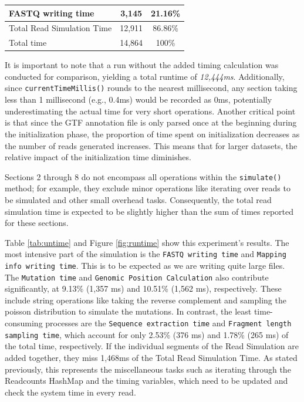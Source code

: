 \documentclass{article}
\begin{document}
\begin{table}[]
{\begin{tabular}{|l|c|c|}
                FASTQ writing time                & 3,145                                                                   & 21.16\%                                                                             \\ \hline
                Total Read Simulation Time        & 12,911                                                                  & 86.86\%                                                                             \\ \hline
                \rowcolor[HTML]{EFEFEF}
                Total time                        & 14,864                                                                  & 100\%                                                                               \\ \hline
            \end{tabular}%
        }
    \end{table}

    It is important to note that a run without the added timing calculation was conducted for comparison, yielding a total runtime of \emph{12,444ms}. Additionally, since \texttt{currentTimeMillis()} rounds to the nearest millisecond, any section taking less than 1 millisecond (e.g., 0.4ms) would be recorded as 0ms, potentially underestimating the actual time for very short operations. Another critical point is that since the GTF annotation file is only parsed once at the beginning during the initialization phase, the proportion of time spent on initialization decreases as the number of reads generated increases. This means that for larger datasets, the relative impact of the initialization time diminishes.


    Sections 2 through 8 do not encompass all operations within the \texttt{simulate()} method; for example, they exclude minor operations like iterating over reads to be simulated and other small overhead tasks. Consequently, the total read simulation time is expected to be slightly higher than the sum of times reported for these sections.

    Table \ref{tab:untime} and Figure \ref{fig:runtime} show this experiment's results. The most intensive part of the simulation is the \texttt{FASTQ writing time} and \texttt{Mapping info writing time}. This is to be expected as we are writing quite large files. The \texttt{Mutation time} and \texttt{Genomic Position Calculation} also contribute significantly, at 9.13\% (1,357 ms) and 10.51\% (1,562 ms), respectively. These include string operations like taking the reverse complement and sampling the poisson distribution to simulate the mutations. In contrast, the least time-consuming processes are the \texttt{Sequence extraction time} and \texttt{Fragment length sampling time}, which account for only 2.53\% (376 ms) and 1.78\% (265 ms) of the total time, respectively. If the individual segments of the Read Simulation are added together, they miss 1,468ms of the Total Read Simulation Time. As stated previously, this represents the miscellaneous tasks such as iterating through the Readcounts HashMap and the timing variables, which need to be updated and check the system time in every read.
\end{document}
